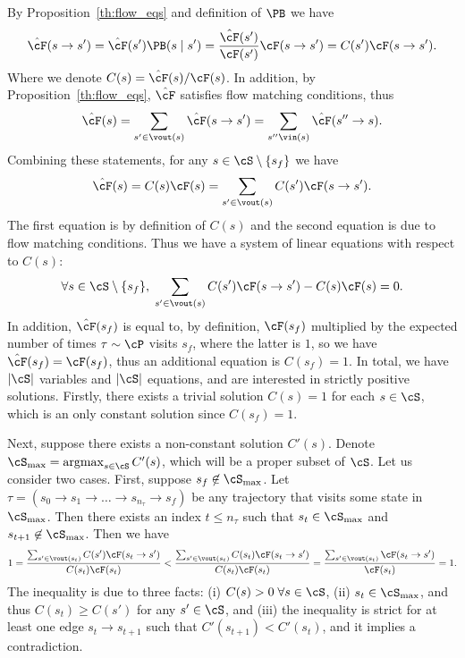 By Proposition~\ref{th:flow_eqs} and definition of $\PB$ we have
$$\hat{\cF}(s \to s') = \hat{\cF}(s')\PB(s \mid s') = \frac{\hat{\cF}(s')}{\cF(s')}\cF(s \to s') = C(s')\cF(s \to s').$$
Where we denote $C(s) = \hat{\cF}(s) / \cF(s)$. In addition, by Proposition~\ref{th:flow_eqs}, $\hat{\cF}$ satisfies flow matching conditions, thus
$$\hat{\cF}(s) = \sum\limits_{s' \in \vout(s)} \hat{\cF}(s \to s') = \sum\limits_{s'' \vin(s)} \hat{\cF}(s'' \to s).$$
Combining these statements, for any $s \in \cS \setminus \{s_f\}$ we have
$$
\hat{\cF}(s) = C(s)\cF(s) = \sum\limits_{s' \in \vout(s)} C(s')\cF(s \to s').
$$
The first equation is by definition of $C(s)$ and the second equation is due to flow matching conditions. Thus we have a system of linear equations with respect to $C(s)$:
$$
\forall s \in \cS \setminus \{s_f\}, \; \sum\limits_{s' \in \vout(s)} C(s')\cF(s \to s') - C(s)\cF(s) = 0.
$$
In addition, $\hat{\cF}(s_f)$ is equal to, by definition, $\cF(s_f)$ multiplied by the expected number of times $\tau \sim \cP$ visits $s_f$, where the latter is $1$, so we have $\hat{\cF}(s_f) = \cF(s_f)$, thus an additional equation is $C(s_f) = 1$. In total, we have $|\cS|$ variables and $|\cS|$ equations, and are interested in strictly positive solutions. Firstly, there exists a trivial solution $C(s) = 1$ for each $s \in \cS$, which is an only constant solution since $C(s_f) = 1$. 

Next, suppose there exists a non-constant solution $C'(s)$. Denote $\cS_{\operatorname{max}} = \operatorname{argmax}\limits_{s \in \cS} C'(s)$, which will be a proper subset of $\cS$. Let us consider two cases. First, suppose $s_f \not\in \cS_{\operatorname{max}}$. Let $\tau = \left(s_0 \to s_1 \to \ldots \to s_{n_{\tau}} \to s_f\right)$ be any trajectory that visits some state in $\cS_{\operatorname{max}}$. Then there exists an index $t \le n_\tau$ such that $s_t \in \cS_{\operatorname{max}}$ and $s_{t+1} \not\in \cS_{\operatorname{max}}$. Then we have
$$
1 = \frac{\sum_{s' \in \vout(s_t)} C(s')\cF(s_t \to s') }{C(s_t)\cF(s_t)} < \frac{\sum_{s' \in \vout(s_t)} C(s_t)\cF(s_t \to s') }{C(s_t)\cF(s_t)} = \frac{\sum_{s' \in \vout(s_t)} \cF(s_t \to s') }{\cF(s_t)} = 1.
$$
The inequality is due to three facts: (i) $C(s) > 0 \; \forall s \in \cS$, (ii) $s_t \in \cS_{\operatorname{max}}$, and thus $C(s_t) \geq C(s')$ for any $s' \in \cS$,  and (iii) the inequality is strict for at least one edge $s_t \to s_{t+1}$ such that $C'(s_{t+1}) < C'(s_t)$, and it implies a contradiction.

